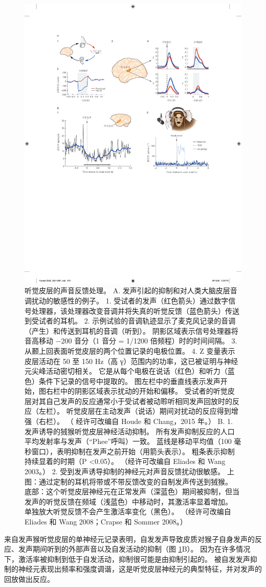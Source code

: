 \begin{figure}[htbp]
	\centering
	\includegraphics[width=0.5\linewidth]{chap28/fig_28_15}
	\caption{听觉皮层的声音反馈处理。 
	A. 发声引起的抑制和对人类大脑皮层音调扰动的敏感性的例子。 
	1. 受试者的发声（红色箭头）通过数字信号处理器，该处理器改变音调并将失真的听觉反馈（蓝色箭头）传送到受试者的耳机。 
	2. 示例试验的音调轨迹显示了麦克风记录的音调（产生）和传送到耳机的音调（听到）。 
	阴影区域表示信号处理器将音高移动 −200 音分（1 音分 = 1/1200 倍频程）时的时间间隔。 
	3. 从颞上回表面听觉皮层的两个位置记录的电极位置。 
	4. Z 变量表示皮层活动在 50 至 150 Hz（高 γ）范围内的功率，这已被证明与神经元尖峰活动密切相关。 
	它是从每个电极在说话（红色）和听力（蓝色）条件下记录的信号中提取的。 
	图左栏中的垂直线表示发声开始，图右栏中的阴影区域表示扰动的开始和偏移。 
	受试者的听觉皮层对其自己发声的反应通常小于受试者被动聆听相同发声回放时的反应（左栏）。 
	听觉皮层在主动发声（说话）期间对扰动的反应得到增强（右栏）。 （
	经许可改编自 Houde 和 Chang，2015 年。）
	B. 1. 发声诱导的狨猴听觉皮层神经活动抑制。 
	所有发声抑制反应的人口平均发射率与发声（“Phee”呼叫）一致。 
	蓝线是移动平均值（100 毫秒窗口），表明抑制在发声之前开始（用箭头表示）。 
	粗条表示抑制持续显着的时期（P <0.05）。 （经许可改编自 Eliades 和 Wang 2003。） 
	2. 受到发声诱导抑制的神经元对声音反馈扰动很敏感。 
	上图：通过定制的耳机将带或不带反馈改变的自制发声传送到狨猴。 
	底部：这个听觉皮层神经元在正常发声（深蓝色）期间被抑制，但当发声的听觉反馈在频域（浅蓝色）中移动时，其激活率显着增加。 
	单独放大听觉反馈不会产生激活率变化（黑色）。 （经许可改编自 Eliades 和 Wang 2008；Crapse 和 Sommer 2008。）}
	\label{fig:28_15}
\end{figure}


来自发声猴听觉皮层的单神经元记录表明，自发发声导致皮质对猴子自身发声的反应、发声期间听到的外部声音以及自发活动的抑制（图 \ref{fig:28_15}B）。 因为在许多情况下，激活率被抑制到低于自发活动，抑制很可能是由抑制引起的。 被自发发声抑制的神经元表现出频率和强度调谐，这是听觉皮层神经元的典型特征，并对发声的回放做出反应。


